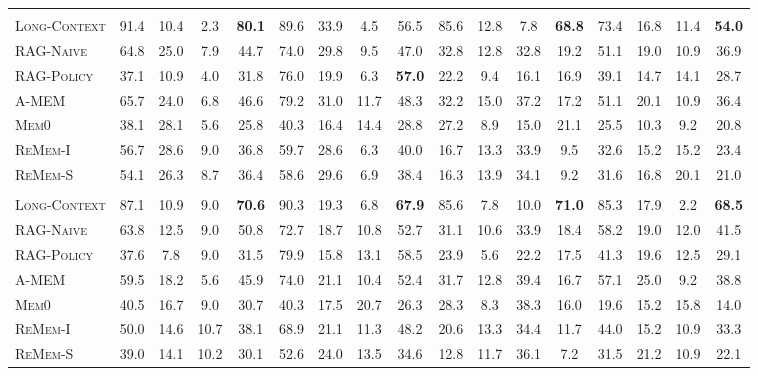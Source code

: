 \begin{table}[t]
{\begin{tabular}{lccc>{\columncolor{cuscol}}c|ccc>{\columncolor{cuscol}}c|ccc>{\columncolor{cuscol}}c|ccc>{\columncolor{cuscol}}c}
\rowcolor{llmheader}
\multicolumn{17}{c}{\textbf{\texttt{GPT-5.4}}} \\
\textsc{Long-Context} & 91.4 & 10.4 & 2.3 & \textbf{80.1} & 89.6 & 33.9 & 4.5 & 56.5 & 85.6 & 12.8 & 7.8 & \textbf{68.8} & 73.4 & 16.8 & 11.4 & \textbf{54.0} \\
\textsc{RAG-Naive}\citep{lewis2020retrieval}    & 64.8 & 25.0 & 7.9 & 44.7 & 74.0 & 29.8 & 9.5 & 47.0 & 32.8 & 12.8 & 32.8 & 19.2 & 51.1 & 19.0 & 10.9 & 36.9 \\
\textsc{RAG-Policy}   & 37.1 & 10.9 & 4.0 & 31.8 & 76.0 & 19.9 & 6.3 & \textbf{57.0} & 22.2 & 9.4 & 16.1 & 16.9 & 39.1 & 14.7 & 14.1 & 28.7 \\
\textsc{A-MEM}~\citep{xu2026mem}        & 65.7 & 24.0 & 6.8 & 46.6 & 79.2 & 31.0 & 11.7 & 48.3 & 32.2 & 15.0 & 37.2 & 17.2 & 51.1 & 20.1 & 10.9 & 36.4 \\
\textsc{Mem0}~\citep{chhikara2025mem0}         & 38.1 & 28.1 & 5.6 & 25.8 & 40.3 & 16.4 & 14.4 & 28.8 & 27.2 & 8.9 & 15.0 & 21.1 & 25.5 & 10.3 & 9.2 & 20.8 \\
\textsc{ReMem-I}~\citep{shu2026remem}      & 56.7 & 28.6 & 9.0 & 36.8 & 59.7 & 28.6 & 6.3 & 40.0 & 16.7 & 13.3 & 33.9 & 9.5 & 32.6 & 15.2 & 15.2 & 23.4 \\
\textsc{ReMem-S}~\citep{shu2026remem}      & 54.1 & 26.3 & 8.7 & 36.4 & 58.6 & 29.6 & 6.9 & 38.4 & 16.3 & 13.9 & 34.1 & 9.2 & 31.6 & 16.8 & 20.1 & 21.0 \\
\midrule

\rowcolor{llmheader}
\multicolumn{17}{c}{\textbf{\texttt{Deepseek-V4-Pro}}} \\
\textsc{Long-Context} & 87.1 & 10.9 & 9.0 & \textbf{70.6} & 90.3 & 19.3 & 6.8 & \textbf{67.9} & 85.6 & 7.8 & 10.0 & \textbf{71.0} & 85.3 & 17.9 & 2.2 & \textbf{68.5} \\
\textsc{RAG-Naive}\citep{lewis2020retrieval}    & 63.8 & 12.5 & 9.0 & 50.8 & 72.7 & 18.7 & 10.8 & 52.7 & 31.1 & 10.6 & 33.9 & 18.4 & 58.2 & 19.0 & 12.0 & 41.5 \\
\textsc{RAG-Policy}   & 37.6 & 7.8 & 9.0 & 31.5 & 79.9 & 15.8 & 13.1 & 58.5 & 23.9 & 5.6 & 22.2 & 17.5 & 41.3 & 19.6 & 12.5 & 29.1 \\
\textsc{A-MEM}~\citep{xu2026mem}        & 59.5 & 18.2 & 5.6 & 45.9 & 74.0 & 21.1 & 10.4 & 52.4 & 31.7 & 12.8 & 39.4 & 16.7 & 57.1 & 25.0 & 9.2 & 38.8 \\
\textsc{Mem0}~\citep{chhikara2025mem0}         & 40.5 & 16.7 & 9.0 & 30.7 & 40.3 & 17.5 & 20.7 & 26.3 & 28.3 & 8.3 & 38.3 & 16.0 & 19.6 & 15.2 & 15.8 & 14.0 \\
\textsc{ReMem-I}~\citep{shu2026remem}      & 50.0 & 14.6 & 10.7 & 38.1 & 68.9 & 21.1 & 11.3 & 48.2 & 20.6 & 13.3 & 34.4 & 11.7 & 44.0 & 15.2 & 10.9 & 33.3 \\
\textsc{ReMem-S}~\citep{shu2026remem}      & 39.0 & 14.1 & 10.2 & 30.1 & 52.6 & 24.0 & 13.5 & 34.6 & 12.8 & 11.7 & 36.1 & 7.2 & 31.5 & 21.2 & 10.9 & 22.1 \\
\midrule


\end{tabular}}
\end{table}
